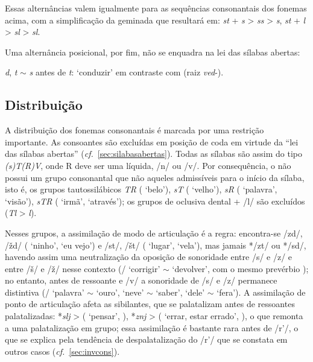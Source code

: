 Essas alternâncias valem igualmente para as sequências consonantais dos fonemas
acima, com a simplificação da geminada que resultará em: \emph{st} + \emph{s} >
\emph{s}\emptyfon{}\emph{s} > \emph{s}, \emph{st} + \emph{l} >
\emph{s}\emptyfon{}\emph{l} > \emph{sl}.

Uma alternância posicional, por fim, não se enquadra na lei das sílabas abertas:

\begin{compactitem}[--]
\item \emph{d}, \emph{t} $\sim$ \emph{s} antes de \emph{t}: 
	 `conduzir' em contraste com 
	 (raiz \emph{ved}-).
\end{compactitem}

\subsection{Distribuição}
A distribuição dos fonemas consonantais é marcada por uma restrição importante.
As consoantes são excluídas em posição de coda em virtude da ``lei das sílabas
abertas'' (\emph{cf.}~\ref{sec:silabasabertas}).
Todas as sílabas são assim do tipo \emph{{(s)}T{(R)}V}, onde R deve ser uma
líquida, /n/ ou /v/.
Por consequência, o  não possui um grupo consonantal que não
aqueles admissíveis para o início da sílaba, isto é, os grupos tautossilábicos
\emph{TR} ( `belo'), \emph{sT}
( `velho'), \emph{sR}
( `palavra',
 `visão'), \emph{sTR}
( `irmã',
 `através'); os grupos de oclusiva dental
+ /l/ são excluídos (\emph{Tl} > \emph{l}).

Nesses grupos, a assimilação de modo de articulação é a regra: encontra-se /zd/,
/žd/ ( `ninho',
 `eu vejo') e /st/, /št/
( `lugar',
 `vela'), mas jamais */zt/ ou */sd/,
havendo assim uma neutralização da oposição de sonoridade entre /s/ e /z/ e
entre /š/ e /ž/ nesse contexto (\slash{}
`corrigir' $\sim$  `devolver', com o
mesmo prevérbio ); no entanto, antes de ressoante e /v/ a sonoridade
de /s/ e /z/ permanece distintiva (\slash{}
`palavra' $\sim$  `ouro',
 `neve' $\sim$
 `saber',
 `dele' $\sim$
 `fera'). A assimilação de ponto de
articulação afeta as sibilantes, que se palatalizam antes de ressoantes
palatalizadas: *\emph{slj} > 
( `pensar', 
), *\emph{znj} > 
( `errar, estar errado',
 ), o que remonta a
uma palatalização em grupo; essa assimilação é bastante rara antes de /r'/, o
que se explica pela tendência de despalatalização do /r'/ que se constata em
outros casos (\emph{cf.}~\ref{sec:invcons}).

